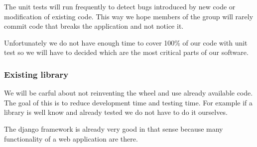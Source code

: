 \documentclass[11pt, a4paper]{article}   	%
\begin{document}
The unit tests will run frequently to detect bugs introduced by new code or modification of existing code. This way we hope members of the group will rarely commit code that breaks the application and not notice it. 
 
Unfortunately we do not have enough time to cover 100\% of our code with unit test so we will have to decided which are the most critical parts of our software. 
 
\subsubsection{Existing library} 
 
We will be carful about not reinventing the wheel and use already available code. The goal of this is to reduce development time and testing time.  
For example if a library is well know and already tested we do not have to do it ourselves. 
 
The django framework is already very good in that sense because many functionality of a web application are there.
 
\end{document}
